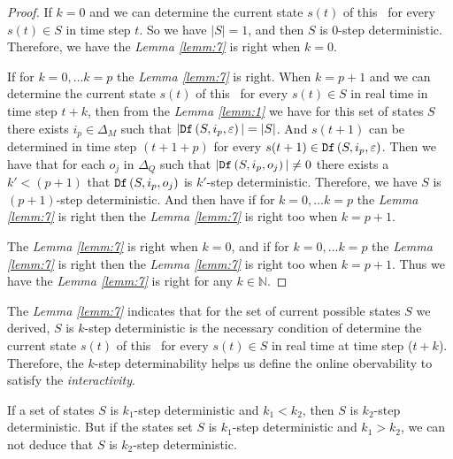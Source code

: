 \begin{proof}
If $k=0$ and we can determine the current state $s(t)$ of this \BCN\ for every $s(t)\in S$ in time step $t$. So we have $|S|=1$, and then $S$ is $0$-step deterministic. Therefore, we have the {\em Lemma \ref{lemm:7}} is right when $k=0$. 

If for $k=0,\ldots k=p$ the {\em Lemma \ref{lemm:7}} is right. When $k=p+1$ and we can determine the current state $s(t)$ of this \BCN\ for every $s(t)\in S$ in real time in time step $t+k$, then from the {\em Lemma \ref{lemm:1}} we have for this set of states $S$ there exists $i_p \in \Delta_M$ such that $|{\tt Df}\left(S,i_p,\varepsilon\right)|=|S|$. And $s(t+1)$ can be determined in time step $(t+1+p)$ for every $s(t+1)\in {\tt Df}\left(S,i_p,\varepsilon\right)$. Then we have that for each $o_j$ in $\Delta_Q$ such that $|{\tt Df}\left(S,i_p,o_j\right)|\neq 0$ there exists a ${k'}<(p+1)$ that ${\tt Df}\left(S,i_p,o_j\right)$ is $k'$-step deterministic.
Therefore, we have $S$ is $(p+1)$-step deterministic. And then have if for $k=0,\ldots k=p$ the {\em Lemma \ref{lemm:7}} is right then the {\em Lemma \ref{lemm:7}} is right too when $k=p+1$. 

The {\em Lemma \ref{lemm:7}} is right when $k=0$, and if for $k=0,\ldots k=p$ the {\em Lemma \ref{lemm:7}} is right then the {\em Lemma \ref{lemm:7}} is right too when $k=p+1$. Thus we have the {\em Lemma \ref{lemm:7}} is right for any $k\in \mathbb{N}$.
\end{proof}

The {\em Lemma \ref{lemm:7}} indicates that for the set of current possible states $S$ we derived, $S$ is $k$-step deterministic is the necessary condition of determine the current state $s(t)$ of this \BCN\ for every $s(t)\in S$ in real time at time step ($t+k$). Therefore, the $k$-step determinability helps us define the online obervability to satisfy the {\em interactivity}. 
\begin{lemma}
 If a set of states $S$ is $k_1$-step deterministic and $k_1< k_2$, then $S$ is $k_2$-step deterministic. But if the states set $S$ is $k_1$-step deterministic and $k_1> k_2$, we can not deduce that $S$ is $k_2$-step deterministic. 
  \label{lemm:2}
\end{lemma}

